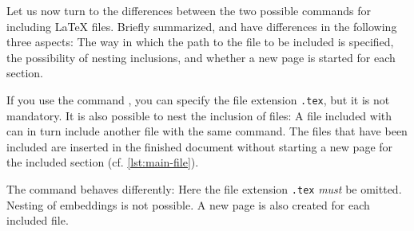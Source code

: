 Let us now turn to the differences between the two possible commands for including \LaTeX{} files. Briefly summarized, \texttt{} and \texttt{} have differences in the following three aspects: The way in which the path to the file to be included is specified, the possibility of nesting inclusions, and whether a new page is started for each section.

If you use the command \texttt{}, you can specify the file extension \texttt{.tex}, but it is not mandatory. It is also possible to nest the inclusion of files: A file included with \texttt{} can in turn include another file with the same command. The files that have been included are inserted in the finished document without starting a new page for the included section (cf. \cref{lst:main-file}).

The command \texttt{} behaves differently: Here the file extension \texttt{.tex} \emph{must} be omitted. Nesting of embeddings is not possible. A new page is also created for each included file.